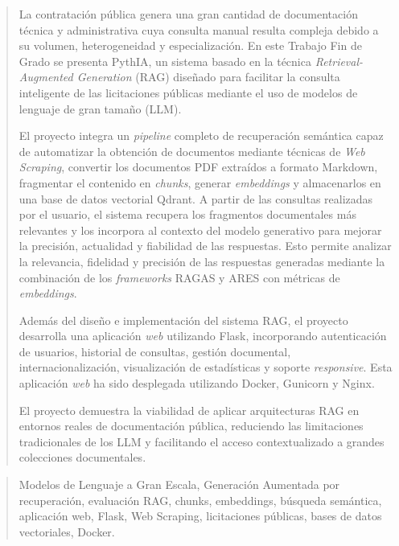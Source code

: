\documentclass[a4paper,12pt,twoside]{memoir}
\newcommand{\eng}[1]{\textit{#1}}
\begin{document}
\renewcommand*\abstractname{Resumen}
\begin{abstract}
La contratación pública genera una gran cantidad de documentación técnica y administrativa cuya consulta manual resulta compleja debido a su volumen, heterogeneidad y especialización. En este Trabajo Fin de Grado se presenta PythIA, un sistema basado en la técnica \eng{Retrieval-Augmented Generation} (RAG) diseñado para facilitar la consulta inteligente de las licitaciones públicas mediante el uso de modelos de lenguaje de gran tamaño (LLM).

El proyecto integra un \eng{pipeline} completo de recuperación semántica capaz de automatizar la obtención de documentos mediante técnicas de \eng{Web Scraping}, convertir los documentos PDF extraídos a formato Markdown, fragmentar el contenido en \eng{chunks}, generar \eng{embeddings} y almacenarlos en una base de datos vectorial Qdrant. A partir de las consultas realizadas por el usuario, el sistema recupera los fragmentos documentales más relevantes y los incorpora al contexto del modelo generativo para mejorar la precisión, actualidad y fiabilidad de las respuestas. Esto permite analizar la relevancia, fidelidad y precisión de las respuestas generadas mediante la combinación de los \eng{frameworks} RAGAS y ARES con métricas de \eng{embeddings}.

Además del diseño e implementación del sistema RAG, el proyecto desarrolla una aplicación \eng{web} utilizando Flask, incorporando autenticación de usuarios, historial de consultas, gestión documental, internacionalización, visualización de estadísticas y soporte \eng{responsive}. Esta aplicación \eng{web} ha sido desplegada utilizando Docker, Gunicorn y Nginx. 

El proyecto demuestra la viabilidad de aplicar arquitecturas RAG en entornos reales de documentación pública, reduciendo las limitaciones tradicionales de los LLM y facilitando el acceso contextualizado a grandes colecciones documentales.
\end{abstract}

\renewcommand*\abstractname{Descriptores}
\begin{abstract}
Modelos de Lenguaje a Gran Escala, Generación Aumentada por recuperación, evaluación RAG, chunks, embeddings, búsqueda semántica, aplicación web, Flask, Web Scraping, licitaciones públicas, bases de datos vectoriales, Docker.
\end{abstract}

\clearpage
\end{document}
